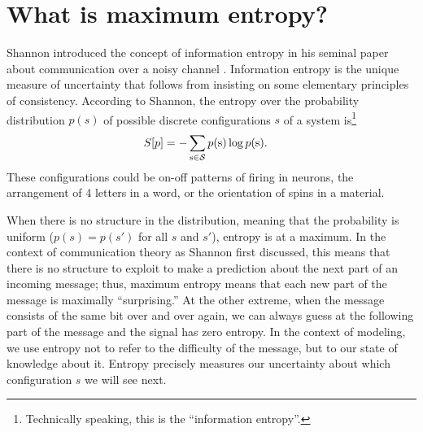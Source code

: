 \documentclass[aps,prl,twocolumn,nofootinbib]{revtex4-1}
\begin{document}

\section{What is maximum entropy?}
Shannon introduced the concept of information entropy in his seminal paper about communication over a noisy channel \cite{Shannon:1948wk}. Information entropy is the unique measure of uncertainty that follows from insisting on some elementary principles of consistency. According to Shannon, the entropy over the probability distribution $p(s)$ of possible discrete configurations $s$ of a system is\footnote{Technically speaking, this is the ``information entropy''.}
\begin{align}
	S[p] &= -\sum_{{\rm s}\in \mathcal{S}} p({\rm s}) \log p({\rm s}).
\end{align}
These configurations could be on-off patterns of firing in neurons, the arrangement of 4 letters in a word, or the orientation of spins in a material.

When there is no structure in the distribution, meaning that the probability is uniform ($p(s) = p(s')$ for all $s$ and $s'$), entropy is at a maximum. In the context of communication theory as Shannon first discussed, this means that there is no structure to exploit to make a prediction about the next part of an incoming message; thus, maximum entropy means that each new part of the message is maximally ``surprising.'' At the other extreme, when the message consists of the same bit over and over again, we can always guess at the following part of the message and the signal has zero entropy. In the context of modeling, we use entropy not to refer to the difficulty of the message, but to our state of knowledge about it. Entropy precisely measures our uncertainty about which configuration $s$ we will see next.
\end{document}
